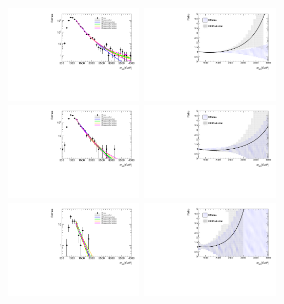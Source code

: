 \begin{figure}[htbp!]
\begin{center}
\includegraphics[width=0.31\textwidth,angle=-90]{figures/boosted/Syst_Shape/QCDSysfitSmooth_22.pdf}
\includegraphics[width=0.31\textwidth,angle=-90]{figures/boosted/Syst_Shape/QCDSysfitSmooth_ratio_22.pdf} \\
\includegraphics[width=0.31\textwidth,angle=-90]{figures/boosted/Syst_Shape/QCDSysfitSmooth_33.pdf}
\includegraphics[width=0.31\textwidth,angle=-90]{figures/boosted/Syst_Shape/QCDSysfitSmooth_ratio_33.pdf} \\
\includegraphics[width=0.31\textwidth,angle=-90]{figures/boosted/Syst_Shape/QCDSysfitSmooth_44.pdf}
\includegraphics[width=0.31\textwidth,angle=-90]{figures/boosted/Syst_Shape/QCDSysfitSmooth_ratio_44.pdf} \\

\end{center}
\end{figure}
